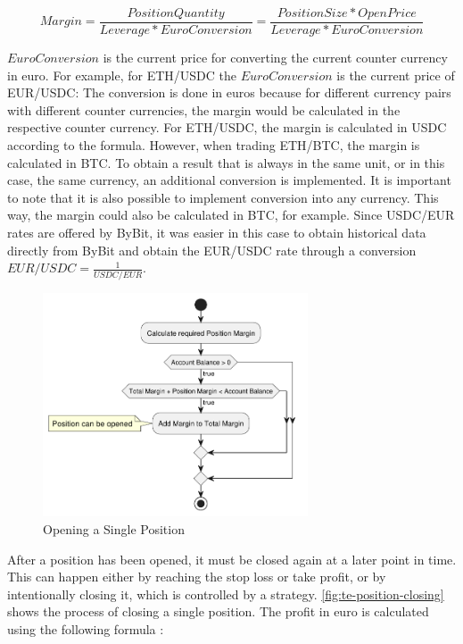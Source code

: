 \[
    Margin = \frac{PositionQuantity}{Leverage * EuroConversion} = \frac{PositionSize * OpenPrice}{Leverage * EuroConversion}
\]

\noindent
$EuroConversion$ is the current price for converting the current counter currency in euro.
For example, for ETH/USDC the $EuroConversion$ is the current price of EUR/USDC:
The conversion is done in euros because for different currency pairs with different counter currencies, the margin would be calculated in the respective counter currency.
For ETH/USDC, the margin is calculated in USDC according to the formula.
However, when trading ETH/BTC, the margin is calculated in BTC.
To obtain a result that is always in the same unit, or in this case, the same currency, an additional conversion is implemented.
It is important to note that it is also possible to implement conversion into any currency.
This way, the margin could also be calculated in BTC, for example.
Since USDC/EUR rates are offered by ByBit, it was easier in this case to obtain historical data directly from ByBit and obtain the EUR/USDC rate through a conversion $EUR/USDC = \frac{1}{USDC/EUR}$.

\begin{figure}[H]
    \centering
    \includegraphics[width=0.7\textwidth]{images/trading-engine/position-opening}
    \caption{Opening a Single Position}
    \label{fig:te-position-opening}
\end{figure}

\noindent
After a position has been opened, it must be closed again at a later point in time.
This can happen either by reaching the stop loss or take profit, or by intentionally closing it, which is controlled by a strategy.
\autoref{fig:te-position-closing} shows the process of closing a single position.
The profit in euro is calculated using the following formula \cite{margin-calculation}:


